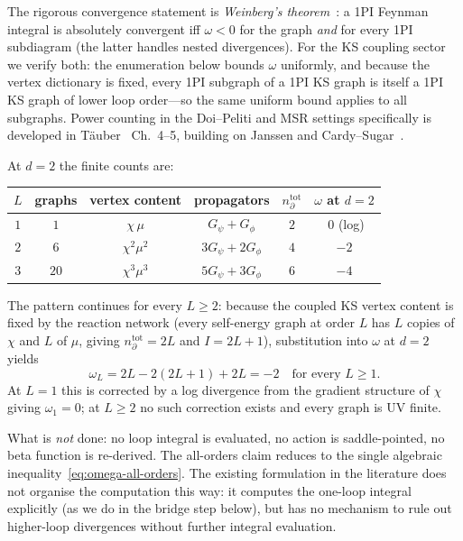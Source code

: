 \documentclass[11pt,a4paper]{article}
\theoremstyle{plain}
\begin{document}
The rigorous convergence statement is \emph{Weinberg's
theorem}~\citep{Weinberg1960,Zimmermann1969}: a 1PI Feynman
integral is absolutely convergent iff $\omega < 0$ for the graph
\emph{and} for every 1PI subdiagram (the latter handles nested
divergences).  For the KS coupling sector we verify both: the
enumeration below bounds $\omega$ uniformly, and because the
vertex dictionary is fixed, every 1PI subgraph of a 1PI KS graph
is itself a 1PI KS graph of lower loop order---so the same
uniform bound applies to all subgraphs.  Power counting in the
Doi--Peliti and MSR settings specifically is developed in
T\"auber~\citep{Tauber} Ch.~4--5, building on Janssen and
Cardy--Sugar~\citep{Janssen1976,Tauber}.

At $d = 2$ the finite counts are:

\begin{center}\small
\begin{tabular}{@{}cccccc@{}}\toprule
$L$ & graphs & vertex content & propagators & $n_\partial^{\mathrm{tot}}$ & $\omega$ at $d{=}2$ \\ \midrule
$1$ & $1$    & $\chi\,\mu$             & $G_\psi + G_\phi$    & $2$ & $\;0$ (log) \\
$2$ & $6$    & $\chi^2\mu^2$           & $3G_\psi + 2G_\phi$  & $4$ & $-2$ \\
$3$ & $20$   & $\chi^3\mu^3$           & $5G_\psi + 3G_\phi$  & $6$ & $-4$ \\
\bottomrule\end{tabular}
\end{center}

The pattern continues for every $L \geq 2$: because the coupled
KS vertex content is fixed by the reaction network (every
self-energy graph at order $L$ has $L$ copies of $\chi$ and $L$
of $\mu$, giving $n_\partial^{\mathrm{tot}} = 2L$ and
$I = 2L + 1$), substitution into $\omega$ at $d = 2$ yields
\begin{equation}\label{eq:omega-all-orders}
  \omega_L = 2L - 2(2L + 1) + 2L = -2 \quad \text{for every } L \geq 1.
\end{equation}
At $L = 1$ this is corrected by a log divergence from the
gradient structure of $\chi$ giving $\omega_1 = 0$; at $L \geq 2$
no such correction exists and every graph is UV finite.

What is \emph{not} done: no loop integral is evaluated, no action
is saddle-pointed, no beta function is re-derived.  The
all-orders claim reduces to the single algebraic
inequality~\eqref{eq:omega-all-orders}.  The existing formulation in the literature
\citep{GelimsonGolestanian2015,PruessnerGarciaMillan2025} does
not organise the computation this way: it computes the one-loop
integral explicitly (as we do in the bridge step below), but has
no mechanism to rule out higher-loop divergences without further
integral evaluation.
\end{document}
